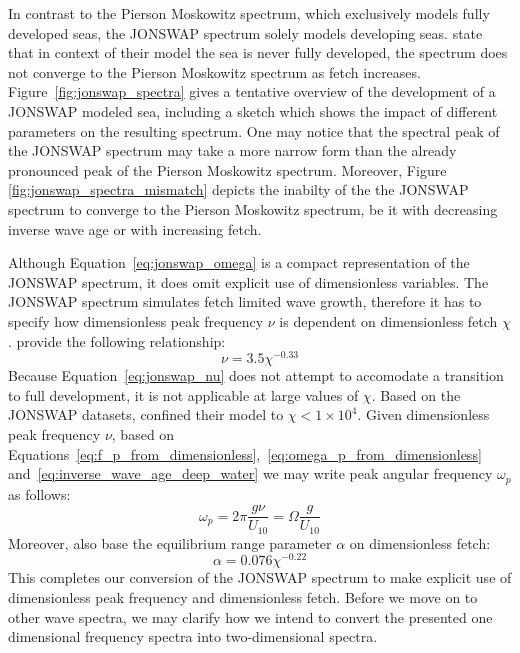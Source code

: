 In contrast to the Pierson Moskowitz spectrum, which exclusively models fully 
developed seas, the JONSWAP spectrum solely models developing seas.
\citeauthor{article:Hasselman1973} state that in context of their model the sea is never fully developed, 
the spectrum does not converge to the Pierson Moskowitz spectrum as fetch 
increases. Figure~\ref{fig:jonswap_spectra} gives a tentative overview of the 
development of a JONSWAP modeled sea, including a sketch which shows the impact 
of different parameters on the resulting spectrum. One may notice that the 
spectral peak of the JONSWAP spectrum may take a more narrow form than the 
already pronounced peak of the Pierson Moskowitz spectrum. Moreover, Figure 
\ref{fig:jonswap_spectra_mismatch} depicts the inabilty of the the JONSWAP 
spectrum to converge to the Pierson Moskowitz spectrum, be it with decreasing 
inverse wave age or with increasing fetch.

Although Equation~\ref{eq:jonswap_omega} is a compact representation of the
JONSWAP spectrum, it does omit explicit use of dimensionless variables.
The JONSWAP spectrum simulates fetch limited wave growth, therefore it has to
specify how dimensionless peak frequency $\nu$ is dependent on dimensionless
fetch $\chi$. \citeauthor{article:Hasselman1973} provide the following relationship:
\begin{equation}
\label{eq:jonswap_nu}
 \nu = 3.5\chi^{-0.33}
\end{equation}
Because Equation~\ref{eq:jonswap_nu} does not attempt to accomodate a transition 
to full development, it is not applicable at large values of $\chi$. Based on 
the JONSWAP datasets, \citeauthor{article:Hasselman1973} confined their model
to $\chi < 1\times10^4$. Given dimensionless peak frequency $\nu$,
based on Equations~\ref{eq:f_p_from_dimensionless},~\ref{eq:omega_p_from_dimensionless} 
and~\ref{eq:inverse_wave_age_deep_water} we may write peak angular frequency
$\omega_p$ as follows:
\begin{equation}
 \omega_p = 2\pi\frac{g\nu}{U_{10}} = \Omega\frac{g}{U_{10}}
\end{equation}
Moreover, \citeauthor{article:Hasselman1973} also base the equilibrium range
parameter $\alpha$ on dimensionless fetch:
\begin{equation}
 \alpha = 0.076 \chi^{-0.22}
\end{equation}
%
This completes our conversion of the JONSWAP spectrum to make explicit use of 
dimensionless peak frequency and dimensionless fetch.
Before we move on to other wave spectra, we may clarify how we intend to
convert the presented one dimensional frequency spectra into two-dimensional
\wavenumber spectra.
%
